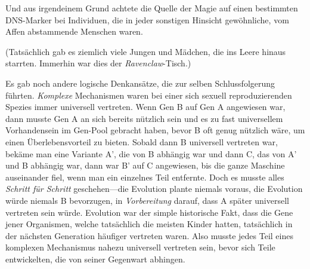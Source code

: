 Und aus irgendeinem Grund achtete die Quelle der Magie auf einen bestimmten DNS-Marker bei Individuen, die in jeder sonstigen Hinsicht gewöhnliche, vom Affen abstammende Menschen waren.

(Tatsächlich gab es ziemlich viele Jungen und Mädchen, die ins Leere hinaus starrten. Immerhin war dies der \emph{Ravenclaw}-Tisch.)

Es gab noch andere logische Denkansätze, die zur selben Schlussfolgerung führten. \emph{Komplexe} Mechanismen waren bei einer sich sexuell reproduzierenden Spezies immer universell vertreten. Wenn Gen B auf Gen A angewiesen war, dann musste Gen A an sich bereits nützlich sein und es zu fast universellem Vorhandensein im Gen-Pool gebracht haben, bevor B oft genug nützlich wäre, um einen Überlebensvorteil zu bieten. Sobald dann B universell vertreten war, bekäme man eine Variante A’, die von B abhängig war und dann C, das von A’ und B abhängig war, dann war B' auf C angewiesen, bis die ganze Maschine auseinander fiel, wenn man ein einzelnes Teil entfernte. Doch es musste alles \emph{Schritt für Schritt} geschehen—die Evolution plante niemals voraus, die Evolution würde niemals B bevorzugen, in \emph{Vorbereitung} darauf, dass A später universell vertreten sein würde. Evolution war der simple historische Fakt, dass die Gene jener Organismen, welche tatsächlich die meisten Kinder hatten, tatsächlich in der nächsten Generation häufiger vertreten waren. Also musste jedes Teil eines komplexen Mechanismus nahezu universell vertreten sein, bevor sich Teile entwickelten, die von seiner Gegenwart abhingen.

